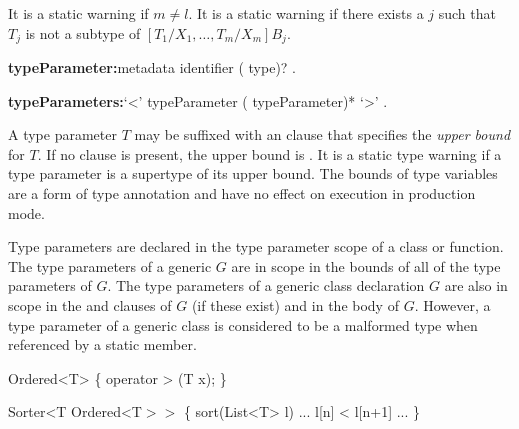 \documentclass{article}
\begin{document}
\LMHash{}
It is a static warning if $m \not= l$.
It is a static warning if there exists a $j$
such that $T_j$ is not a subtype of $[T_1/X_1, \ldots, T_m/X_m]B_j$.


\begin{grammar}
{\bf typeParameter:}metadata identifier (\EXTENDS{} type)?
  .

{\bf typeParameters:}`<' typeParameter (\gcomma{} typeParameter)* `>'
  .
\end{grammar}

\LMHash{}
A type parameter $T$ may be suffixed with an \EXTENDS{} clause that specifies the {\em upper bound} for $T$.
If no \EXTENDS{} clause is present, the upper bound is .
It is a static type warning if a type parameter is a supertype of its upper bound.
The bounds of type variables are a form of type annotation and have no effect on execution in production mode.

\LMHash{}
Type parameters are declared in the type parameter scope of a class or function.
The type parameters of a generic $G$ are in scope in the bounds of all of the type parameters of $G$.
The type parameters of a generic class declaration $G$ are also in scope in the \EXTENDS{} and \IMPLEMENTS{} clauses of $G$ (if these exist) and in the body of $G$.
However, a type parameter of a generic class is considered to be a malformed type when referenced by a static member.




\begin{dartCode}
\CLASS{} Ordered<T> \{
  operator > (T x);
\}

\CLASS{} Sorter<T \EXTENDS{} Ordered<T$>>$ \{
   sort(List<T> l) {... l[n] < l[n+1] ...}
\}

\end{dartCode}
\end{document}
